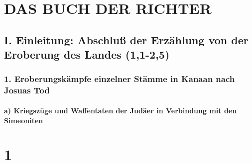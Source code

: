 \hypertarget{das-buch-der-richter}{%
\section{DAS BUCH DER RICHTER}\label{das-buch-der-richter}}

\hypertarget{i.-einleitung-abschluuxdf-der-erzuxe4hlung-von-der-eroberung-des-landes-11-25}{%
\subsection{I. Einleitung: Abschluß der Erzählung von der Eroberung des
Landes
(1,1-2,5)}\label{i.-einleitung-abschluuxdf-der-erzuxe4hlung-von-der-eroberung-des-landes-11-25}}

\hypertarget{eroberungskuxe4mpfe-einzelner-stuxe4mme-in-kanaan-nach-josuas-tod}{%
\subsubsection{1. Eroberungskämpfe einzelner Stämme in Kanaan nach
Josuas
Tod}\label{eroberungskuxe4mpfe-einzelner-stuxe4mme-in-kanaan-nach-josuas-tod}}

\hypertarget{a-kriegszuxfcge-und-waffentaten-der-juduxe4er-in-verbindung-mit-den-simeoniten}{%
\paragraph{a) Kriegszüge und Waffentaten der Judäer in Verbindung mit
den
Simeoniten}\label{a-kriegszuxfcge-und-waffentaten-der-juduxe4er-in-verbindung-mit-den-simeoniten}}

\hypertarget{section}{%
\section{1}\label{section}}

